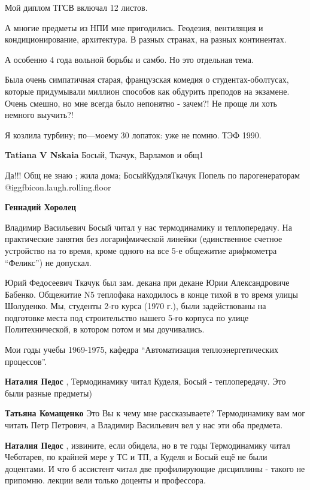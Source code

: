 \begin{itemize}
Мой диплом ТГСВ включал 12 листов.

А многие предметы из НПИ мне пригодились. Геодезия, вентиляция и
кондиционирование, архитектура. В разных странах, на разных континентах.

А особенно 4 года вольной борьбы и самбо. Но это отдельная тема.


Была очень симпатичная старая, французская комедия о студентах-оболтусах,
которые придумывали миллион способов как обдурить преподов на экзамене. Очень
смешно, но мне всегда было непонятно - зачем?! Не проще ли хоть немного
выучить?!


Я козлила турбину; по—моему 30 лопаток: уже не помню. ТЭФ 1990.

\begin{itemize} %
\textbf{Tatiana V Nskaia} Босый, Ткачук, Варламов и общ1

\begin{itemize} %
Да!!! Общ не знаю ; жила дома; БосыйКудэляТкачук Попель по парогенераторам  @igg{fbicon.laugh.rolling.floor} 

\textbf{Геннадий Хоролец} 

Владимир Васильевич Босый читал у нас термодинамику и теплопередачу. На
практические занятия без логарифмической линейки (единственное счетное
устройство на то время, кроме одного на все 5-е общежитие арифмометра \enquote{Феликс})
не допускал.

Юрий Федосеевич Ткачук был зам. декана при декане Юрии Александровиче Бабенко.
Общежитие N5 теплофака находилось в конце тихой в то время улицы Шолуденко. Мы,
студенты 2-го курса (1970 г.), были задействованы на подготовке места под
строительство нашего 5-го корпуса по улице Политехнической, в котором потом и
мы доучивались.

Мои годы учебы 1969-1975, кафедра \enquote{Автоматизация теплоэнергетических
процессов}.

\textbf{Наталия Педос} , Термодинамику читал Куделя, Босый - теплопередачу. Это были разные предметы)

\textbf{Татьяна Комащенко} Это Вы к чему мне рассказываете? Термодинамику вам мог читать Петр Петрович, а Владимир Васильевич вел у нас эти оба предмета.

\textbf{Наталия Педос} , извините, если обидела, но в те годы Термодинамику читал Чеботарев, по крайней мере у ТС и ТП, а Куделя и Босый ещё не были доцентами. И что б ассистент читал две профилирующие дисциплины - такого не припомню. лекции вели только доценты и профессора.


\end{itemize}
\end{itemize}
\end{itemize}
